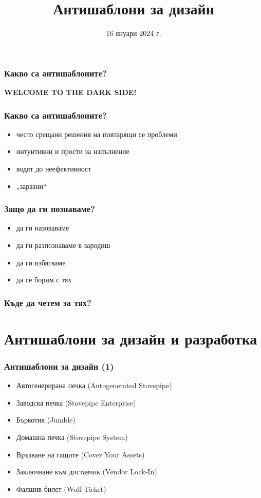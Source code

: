 \documentclass[alsotrans]{beamerswitch}
\title{Антишаблони за дизайн}
\date{16 януари 2024 г.}
\begin{document}
\begin{frame}
  \titlepage
\end{frame}

\begin{frame}
  \frametitle{Какво са антишаблоните?}

  \begin{center}

    \LARGE \textbf{WELCOME TO THE DARK SIDE!}
  \end{center}
\end{frame}

\begin{frame}
  \frametitle{Какво са антишаблоните?}

  \begin{itemize}
  \item често срещани решения на повтарящи се проблеми
  \item интуитивни и прости за изпълнение
  \item водят до неефективност
  \item „заразни“
  \end{itemize}
\end{frame}

\begin{frame}
  \frametitle{Защо да ги познаваме?}

  \begin{itemize}
  \item да ги назоваваме
  \item да ги разпознаваме в зародиш
  \item да ги избягваме
  \item да се борим с тях
  \end{itemize}
\end{frame}

\begin{frame}
  \frametitle{Къде да четем за тях?}
  \nocite{*}
  
  
\end{frame}

\section{Антишаблони за дизайн и разработка}

\begin{frame}
  \frametitle{Антишаблони за дизайн (1)}

  \begin{itemize}[<+->]
  \item Автогенерирана печка (Autogenerated Stovepipe)
  \item Заводска печка (Stovepipe Enterprise)
  \item Бъркотия (Jumble)
  \item Домашна печка (Stovepipe System)
  \item Връзване на гащите (Cover Your Assets)
  \item Заключване към доставчик (Vendor Lock-In)
  \item Фалшив билет (Wolf Ticket)
  \end{itemize}
\end{frame}
\end{document}
